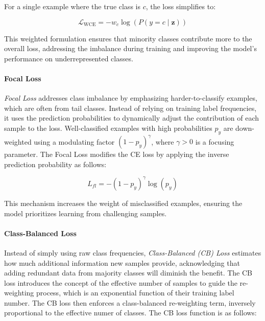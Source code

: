 For a single example where the true class is \( c \), the loss simplifies to:

\begin{equation}
    \mathcal{L}_{\text{WCE}} = -w_c \log(P(y = c \mid \mathbf{z}))
\end{equation}

This weighted formulation ensures that minority classes contribute more to the overall loss, addressing the imbalance during training and improving the model's performance on underrepresented classes.


\paragraph{Focal Loss}
\emph{Focal Loss} \cite{lin2018focallossdenseobject} addresses class imbalance by emphasizing harder-to-classify examples, which are often from tail classes. Instead of relying on training label frequencies, it uses the prediction probabilities to dynamically adjust the contribution of each sample to the loss. Well-classified examples with high probabilities $p_y$ are down-weighted using a modulating factor $(1 - p_y)^\gamma$, where $\gamma > 0$ is a focusing parameter. The Focal Loss modifies the CE loss by applying the inverse prediction probability as follows:

\begin{equation}
    L_{fl} = -(1 - p_y)^\gamma \log(p_y)
\end{equation}

This mechanism increases the weight of misclassified examples, ensuring the model prioritizes learning from challenging samples. 

\paragraph{Class-Balanced Loss}
Instead of simply using raw class frequencies, \emph{Class-Balanced (CB) Loss} \cite{cui2019classbalancedlossbasedeffective} estimates how much additional information new samples provide, acknowledging that adding redundant data from majority classes will diminish the benefit. The CB loss introduces the concept of the effective number of samples to guide the re-weighting process, which is an exponential function of their training label number. The CB loss then enforces a class-balanced re-weighting term, inversely proportional to the effective numer of classes. The CB loss function is as follows:

